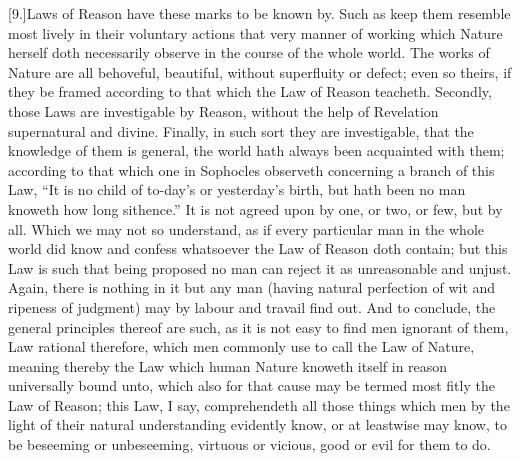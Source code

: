 [9.]Laws of Reason have these marks to be known by. Such as keep them resemble most lively in their voluntary actions that very manner of working which Nature herself doth necessarily observe in the course of the whole world. The works of Nature are all behoveful, beautiful, without superfluity or defect; even so theirs, if they be framed according to that which the Law of Reason teacheth. Secondly, those Laws are investigable by Reason, without the help of Revelation supernatural and divine. Finally, in such sort they are investigable, that the knowledge of them is general, the world hath always been acquainted with them; according to that which one in Sophocles observeth concerning a branch of this Law, “It is no child of to-day’s or yesterday’s birth, but hath been no man knoweth how long sithence.” It is not agreed upon by one, or two, or few, but by all. Which we may not so understand, as if every particular man in the whole world did know and confess whatsoever the Law of Reason doth contain; but this Law is such that being proposed no man can reject it as unreasonable and unjust. Again, there is nothing in it but any man (having natural perfection of wit and ripeness of judgment) may by labour and travail find out. And to conclude, the general principles thereof are such, as it is not easy to find men ignorant of them, Law rational therefore, which men commonly use to call the Law of Nature, meaning thereby the Law which human Nature knoweth itself in reason universally bound unto, which also  for that cause may be termed most fitly the Law of Reason; this Law, I say, comprehendeth all those things which men by the light of their natural understanding evidently know, or at leastwise may know, to be beseeming or unbeseeming, virtuous or vicious, good or evil for them to do.

